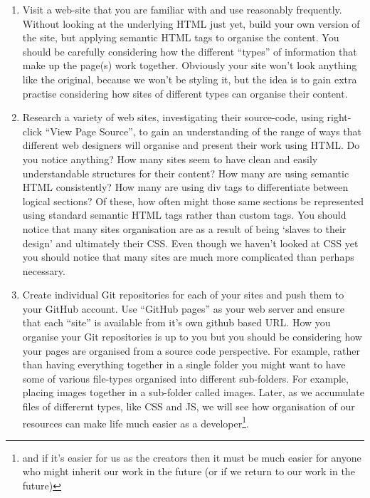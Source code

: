 \documentclass[10pt, a4paper]{article}
\begin{document}
\begin{enumerate}
\item Visit a web-site that you are familiar with and use reasonably frequently. Without looking at the underlying HTML just yet, build your own version of the site, but applying semantic HTML tags to organise the content. You should be carefully considering how the different ``types'' of information that make up the page(s) work together. Obviously your site won't look anything like the original, because we won't be styling it, but the idea is to gain extra practise considering how sites of different types can organise their content.

\item Research a variety of web sites, investigating their source-code, using right-click ``View Page Source'', to gain an understanding of the range of ways that different web designers will organise and present their work using HTML. Do you notice anything? How many sites seem to have clean and easily understandable structures for their content? How many are using semantic HTML consistently? How many are using div tags to differentiate between logical sections? Of these, how often might those same sections be represented using standard semantic HTML tags rather than custom tags. You should notice that many sites organisation are as a result of being `slaves to their design' and ultimately their CSS. Even though we haven't looked at CSS yet you should notice that many sites are much more complicated than perhaps necessary.

\item Create individual Git repositories for each of your sites and push them to your GitHub account. Use ``GitHub pages'' as your web server and ensure that each ``site'' is available from it's own github based URL. How you organise your Git repositories is up to you but you should be considering how your pages are organised from a source code perspective. For example, rather than having everything together in a single folder you might want to have some of various file-types organised into different sub-folders. For example, placing images together in a sub-folder called images. Later, as we accumulate files of differernt types, like CSS and JS, we will see how organisation of our resources can make life much easier as a developer\footnote{and if it's easier for us as the creators then it must be much easier for anyone who might inherit our work in the future (or if we return to our work in the future)}.

\end{enumerate}
\end{document}
